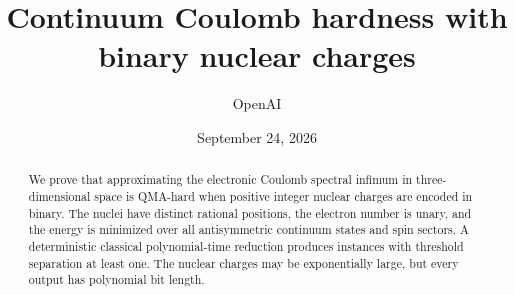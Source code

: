 \documentclass[11pt]{article}
\title{Continuum Coulomb hardness with binary nuclear charges}
\author{OpenAI}
\date{September 24, 2026}
\begin{document}
\maketitle
\begin{abstract}
We prove that approximating the electronic Coulomb spectral infimum in three-dimensional space is QMA-hard when positive integer nuclear charges are encoded in binary. The nuclei have distinct rational positions, the electron number is unary, and the energy is minimized over all antisymmetric continuum states and spin sectors. A deterministic classical polynomial-time reduction produces instances with threshold separation at least one. The nuclear charges may be exponentially large, but every output has polynomial bit length.
\end{abstract}








\end{document}
